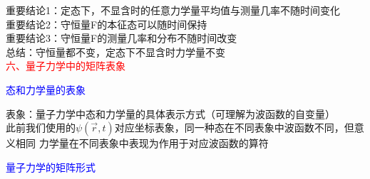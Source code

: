 \documentclass[a4paper,8pt]{extarticle} %
\newcommand{\bluetext}[1]{\textcolor{blue}{#1}}
\newcommand{\redtext}[1]{\textcolor{red}{#1}}
\begin{document}
\begin{multicols}{3}
重要结论1：定态下，不显含时的任意力学量平均值与测量几率不随时间变化\\
重要结论2：守恒量F的本征态可以随时间保持\\
重要结论3：守恒量F的测量几率和分布不随时间改变\\
总结：守恒量都不变，定态下不显含时力学量不变\\
\redtext{六、量子力学中的矩阵表象}

\bluetext{态和力学量的表象}

表象：量子力学中态和力学量的具体表示方式（可理解为波函数的自变量）\\
此前我们使用的$\psi(\vec{r},t)$对应坐标表象，同一种态在不同表象中波函数不同，但意义相同
力学量在不同表象中表现为作用于对应波函数的算符

\bluetext{量子力学的矩阵形式}


\end{multicols}
\end{document}
